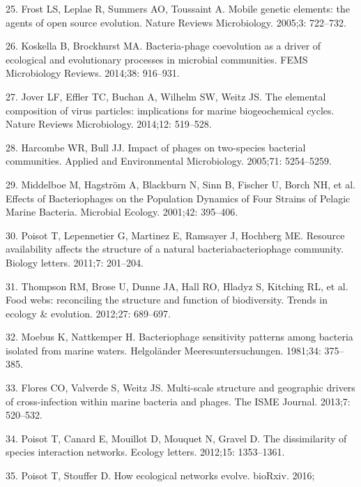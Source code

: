 \documentclass[12pt,]{article}
\begin{document}
\hypertarget{ref-Frost:2005dn}{}
25. Frost LS, Leplae R, Summers AO, Toussaint A. Mobile genetic
elements: the agents of open source evolution. Nature Reviews
Microbiology. 2005;3: 722--732.

\hypertarget{ref-Koskella:2014ds}{}
26. Koskella B, Brockhurst MA. Bacteria-phage coevolution as a driver of
ecological and evolutionary processes in microbial communities. FEMS
Microbiology Reviews. 2014;38: 916--931.

\hypertarget{ref-Jover:2014gq}{}
27. Jover LF, Effler TC, Buchan A, Wilhelm SW, Weitz JS. The elemental
composition of virus particles: implications for marine biogeochemical
cycles. Nature Reviews Microbiology. 2014;12: 519--528.

\hypertarget{ref-Harcombe:2005fd}{}
28. Harcombe WR, Bull JJ. Impact of phages on two-species bacterial
communities. Applied and Environmental Microbiology. 2005;71:
5254--5259.

\hypertarget{ref-Middelboe:2001fl}{}
29. Middelboe M, Hagström A, Blackburn N, Sinn B, Fischer U, Borch NH,
et al. Effects of Bacteriophages on the Population Dynamics of Four
Strains of Pelagic Marine Bacteria. Microbial Ecology. 2001;42:
395--406.

\hypertarget{ref-Poisot:2011jc}{}
30. Poisot T, Lepennetier G, Martinez E, Ramsayer J, Hochberg ME.
Resource availability affects the structure of a natural
bacteriabacteriophage community. Biology letters. 2011;7: 201--204.

\hypertarget{ref-Thompson:2012ki}{}
31. Thompson RM, Brose U, Dunne JA, Hall RO, Hladyz S, Kitching RL, et
al. Food webs: reconciling the structure and function of biodiversity.
Trends in ecology \& evolution. 2012;27: 689--697.

\hypertarget{ref-Moebus:1981kp}{}
32. Moebus K, Nattkemper H. Bacteriophage sensitivity patterns among
bacteria isolated from marine waters. Helgoländer Meeresuntersuchungen.
1981;34: 375--385.

\hypertarget{ref-Flores:2013hc}{}
33. Flores CO, Valverde S, Weitz JS. Multi-scale structure and
geographic drivers of cross-infection within marine bacteria and phages.
The ISME Journal. 2013;7: 520--532.

\hypertarget{ref-Poisot:2012fh}{}
34. Poisot T, Canard E, Mouillot D, Mouquet N, Gravel D. The
dissimilarity of species interaction networks. Ecology letters. 2012;15:
1353--1361.

\hypertarget{ref-Poisot071993}{}
35. Poisot T, Stouffer D. How ecological networks evolve. bioRxiv. 2016;
\end{document}
